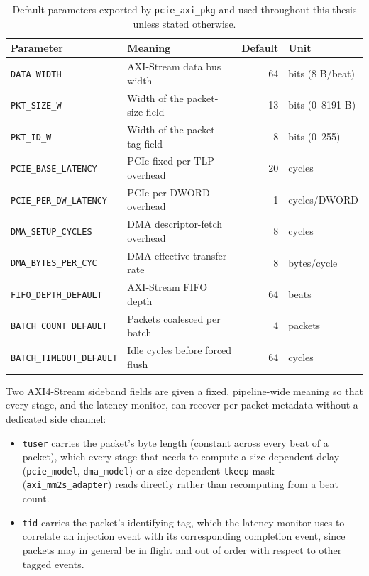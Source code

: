 \begin{table}[htbp]
\centering
\begin{tabular}{@{}llrl@{}}
\toprule
\textbf{Parameter} & \textbf{Meaning} & \textbf{Default} & \textbf{Unit} \\
\midrule
\texttt{DATA\_WIDTH}        & AXI-Stream data bus width         & 64  & bits (8 B/beat) \\
\texttt{PKT\_SIZE\_W}       & Width of the packet-size field     & 13  & bits (0--8191 B) \\
\texttt{PKT\_ID\_W}         & Width of the packet tag field       & 8   & bits (0--255) \\
\texttt{PCIE\_BASE\_LATENCY}   & PCIe fixed per-TLP overhead      & 20  & cycles \\
\texttt{PCIE\_PER\_DW\_LATENCY}& PCIe per-DWORD overhead          & 1   & cycles/DWORD \\
\texttt{DMA\_SETUP\_CYCLES}    & DMA descriptor-fetch overhead    & 8   & cycles \\
\texttt{DMA\_BYTES\_PER\_CYC}  & DMA effective transfer rate      & 8   & bytes/cycle \\
\texttt{FIFO\_DEPTH\_DEFAULT}  & AXI-Stream FIFO depth            & 64  & beats \\
\texttt{BATCH\_COUNT\_DEFAULT} & Packets coalesced per batch      & 4   & packets \\
\texttt{BATCH\_TIMEOUT\_DEFAULT}& Idle cycles before forced flush & 64  & cycles \\
\bottomrule
\end{tabular}
\caption{Default parameters exported by \texttt{pcie\_axi\_pkg} and used throughout this thesis unless stated otherwise.}
\label{tab:pkg_params}
\end{table}

Two AXI4-Stream sideband fields are given a fixed, pipeline-wide meaning so that every stage, and the latency monitor, can recover per-packet metadata without a dedicated side channel:
\begin{itemize}
    \item \texttt{tuser} carries the packet's byte length (constant across every beat of a packet), which every stage that needs to compute a size-dependent delay (\texttt{pcie\_model}, \texttt{dma\_model}) or a size-dependent \texttt{tkeep} mask (\texttt{axi\_mm2s\_adapter}) reads directly rather than recomputing from a beat count.
    \item \texttt{tid} carries the packet's identifying tag, which the latency monitor uses to correlate an injection event with its corresponding completion event, since packets may in general be in flight and out of order with respect to other tagged events.
\end{itemize}

